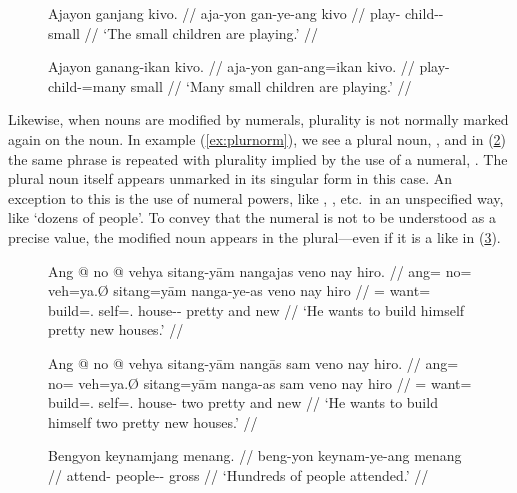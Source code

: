 \begin{figure}[h]
\pex\label{ex:quantplur}
\a\begingl
	\gla Ajayon ganjang kivo. //
	\glb aja-yon gan-ye-ang kivo //
	\glc play-\TplN{} child-\Pl{}-\Aarg{} small //
	\glft `The small children are playing.' //
\endgl
	
\a\label{ex:nounquant}\begingl
	\gla Ajayon ganang-ikan kivo. //
	\glb aja-yon gan-ang=ikan kivo. //
	\glc play-\TplN{} child-\Aarg{}=many small //
	\glft `Many small children are playing.' //
\endgl
\xe
\end{figure}

Likewise, when nouns are modified by numerals, plurality is not
normally marked again on the noun. In example (\ref{ex:plurnorm}), we see a
plural noun, , and in (\ref{ex:plurnum}) the same phrase
is repeated with plurality implied by the use of a numeral,
. The plural noun itself appears unmarked in its singular
form in this case. An exception to this is the use of numeral powers, like
, , etc.\ in an unspecified
way, like `dozens of people'. To convey that the numeral is not to be
understood as a precise value, the modified noun appears in the plural---even
if it is a  like  in
(\ref{ex:keynamplur}).

\begin{figure}[h]
\pex
\a\label{ex:plurnorm}\begingl
	\gla Ang @ no @ vehya sitang-yām nangajas veno nay hiro. //
	\glb ang= no= veh=ya.Ø sitang=yām nanga-ye-as veno nay hiro //
	\glc \AgtT{}= want= build=\TsgM.\Top{} self=\TsgM{}.\Dat{} 
		house-\Pl{}-\Parg{} pretty and new //
	\glft `He wants to build himself pretty new houses.' //
\endgl

\a\label{ex:plurnum}\begingl
	\gla Ang @ no @ vehya sitang-yām nangās sam veno nay hiro. //
	\glb ang= no= veh=ya.Ø sitang=yām nanga-as sam veno nay hiro //
	\glc \AgtT{}= want= build=\TsgM.\Top{} self=\TsgM{}.\Dat{} house-\Parg{} 
		two pretty and new //
	\glft `He wants to build himself two pretty new houses.' //
\endgl
\xe
\end{figure}

\begin{figure}
\ex\label{ex:keynamplur}%
\begingl
	\gla Bengyon keynamjang menang. //
	\glb beng-yon keynam-ye-ang menang //
	\glc attend-\TsgN{} people-\Pl{}-\Aarg{} gross //
	\glft `Hundreds of people attended.' //
\endgl\xe
\end{figure}

